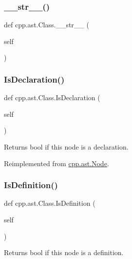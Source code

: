\subsubsection{\texorpdfstring{\_\_str\_\_()}{\_\_str\_\_()}}
{\footnotesize\ttfamily def cpp.\+ast.\+Class.\+\_\+\+\_\+str\+\_\+\+\_\+ (\begin{DoxyParamCaption}\item[{}]{self }\end{DoxyParamCaption})}

\mbox{\label{classcpp_1_1ast_1_1Class_a4758bfb7c00410575932974e1ed8b7da}} 
\subsubsection{\texorpdfstring{IsDeclaration()}{IsDeclaration()}}
{\footnotesize\ttfamily def cpp.\+ast.\+Class.\+Is\+Declaration (\begin{DoxyParamCaption}\item[{}]{self }\end{DoxyParamCaption})}

\begin{DoxyVerb}Returns bool if this node is a declaration.\end{DoxyVerb}
 

Reimplemented from \mbox{\hyperlink{classcpp_1_1ast_1_1Node_ab3eca703a79fb65bc25dfbcb7547c79e}{cpp.\+ast.\+Node}}.

\mbox{\label{classcpp_1_1ast_1_1Class_ae6d2356f835d06d5109d9e4609d86780}} 
\subsubsection{\texorpdfstring{IsDefinition()}{IsDefinition()}}
{\footnotesize\ttfamily def cpp.\+ast.\+Class.\+Is\+Definition (\begin{DoxyParamCaption}\item[{}]{self }\end{DoxyParamCaption})}

\begin{DoxyVerb}Returns bool if this node is a definition.\end{DoxyVerb}
 

